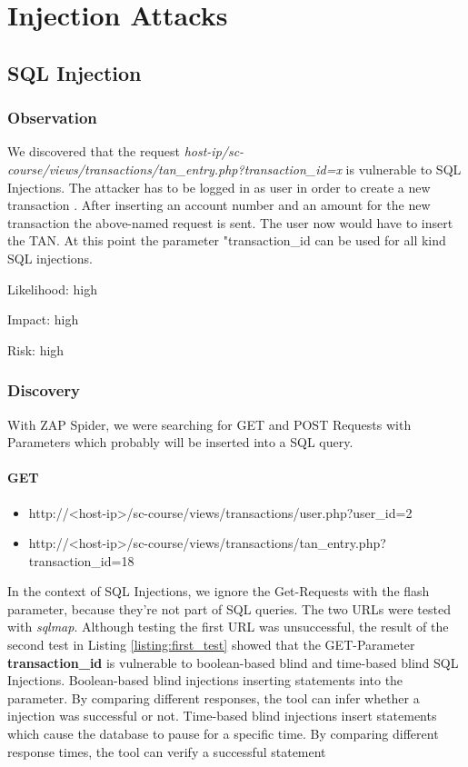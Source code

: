 
\chapter{Injection Attacks}

\section{SQL Injection}

\subsection{Observation}

We discovered that the request \textit{host-ip/sc-course/views/transactions/tan\_entry.php?transaction\_id=x} is vulnerable to SQL Injections.
The attacker has to be logged in as user in order to create a new transaction . After inserting an account number and an amount for the new transaction the above-named request is sent. The user now would have to insert the TAN. At this point the parameter "transaction\_id can be used for all kind SQL injections.


Likelihood: high\newline

Impact:      	high\newline

Risk: high \newline

\subsection{Discovery}
With ZAP Spider, we were searching for GET and POST Requests with Parameters which probably will be inserted into a SQL query.

\subsubsection{GET}
\begin{itemize}
	\item http://<host-ip>/sc-course/views/transactions/user.php?user\_id=2 
	\item http://<host-ip>/sc-course/views/transactions/tan\_entry.php?transaction\_id=18
	
\end{itemize}
 In the context of SQL Injections, we ignore the Get-Requests with the flash parameter, because they're not part of SQL queries.
 The two URLs were tested with \textit{sqlmap}. Although testing the first URL was unsuccessful, the result of the second test in Listing \ref{listing:first_test} showed that the GET-Parameter\textbf{ transaction\_id} is vulnerable to boolean-based blind and time-based blind SQL Injections. Boolean-based blind injections inserting statements into the parameter. By comparing different responses, the tool can infer whether a injection was successful or not.
 Time-based blind injections insert statements which cause the database to pause for a specific time. By comparing different response times, the tool can verify a successful statement
 



